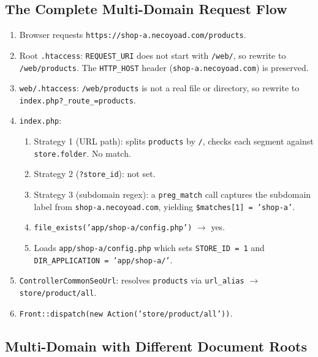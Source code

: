 \documentclass[11pt,a4paper]{article}
\begin{document}
\subsection{The Complete Multi-Domain Request Flow}

\begin{enumerate}[leftmargin=1.6em,itemsep=2pt]
  \item Browser requests \texttt{https://shop-a.necoyoad.com/products}.
  \item Root \texttt{.htaccess}: \texttt{REQUEST\_URI} does not start
        with \texttt{/web/}, so rewrite to
        \texttt{/web/products}. The \texttt{HTTP\_HOST} header
        (\texttt{shop-a.necoyoad.com}) is preserved.
  \item \texttt{web/.htaccess}: \texttt{/web/products} is not a real
        file or directory, so rewrite to
        \texttt{index.php?\_route\_=products}.
  \item \texttt{index.php}:
        \begin{enumerate}[itemsep=2pt]
          \item Strategy 1 (URL path): splits \texttt{products} by
                \texttt{/}, checks each segment against
                \texttt{store.folder}. No match.
          \item Strategy 2 (\texttt{?store\_id}): not set.
          \item Strategy 3 (subdomain regex): a \texttt{preg\_match}
                call captures the subdomain label from
                \texttt{shop-a.necoyoad.com}, yielding
                \texttt{\$matches[1] = 'shop-a'}.
          \item \texttt{file\_exists('app/shop-a/config.php')} $\to$ yes.
          \item Loads \texttt{app/shop-a/config.php} which sets
                \texttt{STORE\_ID = 1} and
                \texttt{DIR\_APPLICATION = 'app/shop-a/'}.
        \end{enumerate}
  \item \texttt{ControllerCommonSeoUrl}: resolves \texttt{products} via
        \texttt{url\_alias} $\to$ \texttt{store/product/all}.
  \item \texttt{Front::dispatch(new Action('store/product/all'))}.
\end{enumerate}

\subsection{Multi-Domain with Different Document Roots}
\end{document}
